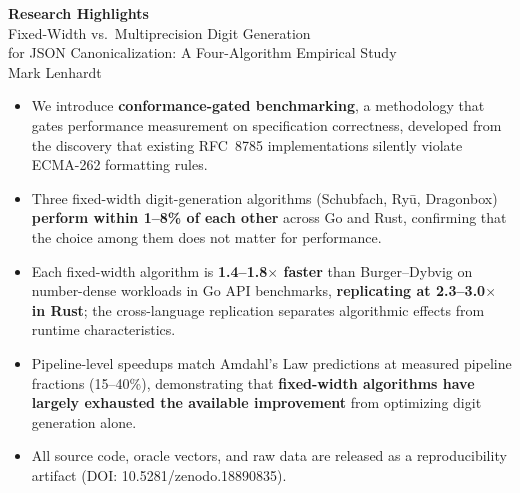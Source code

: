\documentclass[12pt]{article}
\begin{document}
\begin{center}
{\Large\bfseries Research Highlights}\\[6pt]
{\large Fixed-Width vs.\ Multiprecision Digit Generation\\
for JSON Canonicalization: A Four-Algorithm Empirical Study}\\[6pt]
Mark Lenhardt
\end{center}

\vspace{1em}

\begin{itemize}[leftmargin=*, itemsep=8pt]

\item We introduce \textbf{conformance-gated benchmarking}, a
      methodology that gates performance measurement on specification
      correctness, developed from the discovery that existing RFC~8785
      implementations silently violate ECMA-262 formatting rules.

\item Three fixed-width digit-generation algorithms (Schubfach,
      Ry\=u, Dragonbox) \textbf{perform within 1--8\% of each other}
      across Go and Rust, confirming that the choice among them does
      not matter for performance.

\item Each fixed-width algorithm is \textbf{1.4--1.8$\times$ faster}
      than Burger--Dybvig on number-dense workloads in Go API
      benchmarks, \textbf{replicating at 2.3--3.0$\times$ in Rust};
      the cross-language replication separates algorithmic effects from
      runtime characteristics.

\item Pipeline-level speedups match Amdahl's Law predictions at
      measured pipeline fractions (15--40\%), demonstrating that
      \textbf{fixed-width algorithms have largely exhausted the
      available improvement} from optimizing digit generation alone.

\item All source code, oracle vectors, and raw data are released as
      a reproducibility artifact
      (DOI: 10.5281/zenodo.18890835).

\end{itemize}
\end{document}
